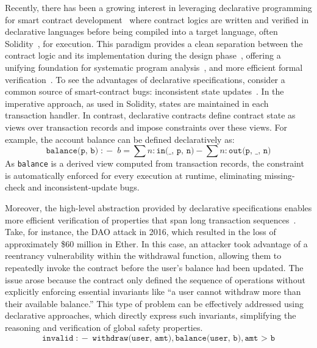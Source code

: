 Recently, there has been a growing interest in leveraging declarative programming for smart contract development~\cite{dcv-icse24, chen2022declarative} where contract logics are written and verified in declarative languages before being compiled into a target language, often Solidity~\cite{solidity}, for execution. This paradigm provides a clean separation between the contract logic and its implementation during the design phase~\cite{declarative-contract,chen2022declarative,datalog-contract-2,datalog-contract-3}, offering a unifying foundation for systematic program analysis~\cite{Tsankov2018Securify,datalog-analysis,datalog-analysis-2,datalog-analysis-3,datalog-analysis-4}, and more efficient formal verification~\cite{dcv-icse24}.
To see the advantages of declarative specifications, consider a common source of smart-contract bugs: inconsistent state updates~\cite{chen2022declarative}. In the imperative approach, as used in Solidity, states are maintained in each transaction handler. In contrast, declarative contracts define contract state as views over transaction records and impose constraints over these views. For example, the account balance can be defined declaratively as:
\[
\texttt{balance(p, b)} \;:\!- \;
b = \sum n:\texttt{in(\_, p, n)} - \sum n:\texttt{out(p, \_, n)}
\]
As \texttt{balance} is a derived view computed from transaction records, the constraint is automatically enforced for every execution at runtime, eliminating missing-check and inconsistent-update bugs. 

Moreover, the high-level abstraction provided by declarative specifications enables more efficient verification of properties that span long transaction sequences~\cite{dcv-icse24}.
Take, for instance, the DAO attack in 2016, which resulted in the loss of approximately \$60 million in Ether. In this case, an attacker took advantage of a reentrancy vulnerability within the withdrawal function, allowing them to repeatedly invoke the contract before the user's balance had been updated. The issue arose because the contract only defined the sequence of operations without explicitly enforcing essential invariants like “a user cannot withdraw more than their available balance.” This type of problem can be effectively addressed using declarative approaches, which directly express such invariants, simplifying the reasoning and verification of global safety properties.
\[
\texttt{invalid} \;:\!- \;
    \texttt{withdraw(user, amt)},
    \texttt{balance(user, b)},
    \texttt{amt > b}
\]

